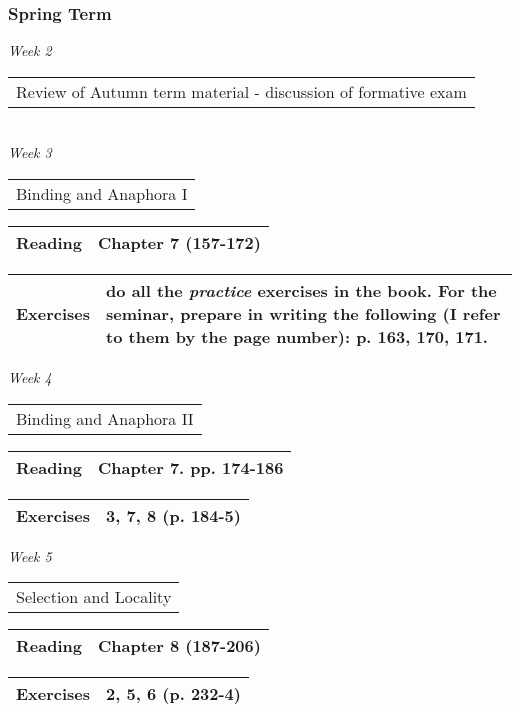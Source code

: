 \documentclass[12pt]{article}
\begin{document}
\subsubsection*{Spring Term}
\textit{Week 2} \dotfill \begin{tabular}[t]{l} Review of Autumn term material - discussion of formative exam\\ \end{tabular} \\
\textit{Week 3} \dotfill \begin{tabular}[t]{l} Binding and Anaphora I \end{tabular}
\begin{flushright}
\begin{tabular}[t]{|l|p{2in}|}\hline \textbf{Reading} & Chapter 7 (157-172) \\\hline
\end{tabular}

\begin{tabular}[t]{|l|p{4in}|}\hline \textbf{Exercises} & do all the \textit{practice} exercises in the book.  For the seminar, prepare in writing the following (I refer to them by the page number): p. 163, 170, 171. \\ \hline
\end{tabular}
\end{flushright}
\textit{Week 4} \dotfill \begin{tabular}[t]{l} Binding and Anaphora II \end{tabular}
\begin{flushright}
\begin{tabular}[t]{|l|p{2in}|}\hline \textbf{Reading} & Chapter 7.  pp. 174-186 \\\hline \end{tabular}

\begin{tabular}[t]{|l|p{4in}|}\hline \textbf{Exercises} & 3, 7, 8 (p. 184-5) \\ \hline
\end{tabular}

\end{flushright}
\textit{Week 5} \dotfill \begin{tabular}[t]{l} Selection and Locality \end{tabular}
\begin{flushright}
\begin{tabular}[t]{|l|p{2in}|}\hline \textbf{Reading} & Chapter 8 (187-206) \\\hline \end{tabular}


\begin{tabular}[t]{|l|p{4in}|}\hline \textbf{Exercises} & 2, 5, 6  (p. 232-4) \\ \hline
\end{tabular}


\end{flushright}
\end{document}
